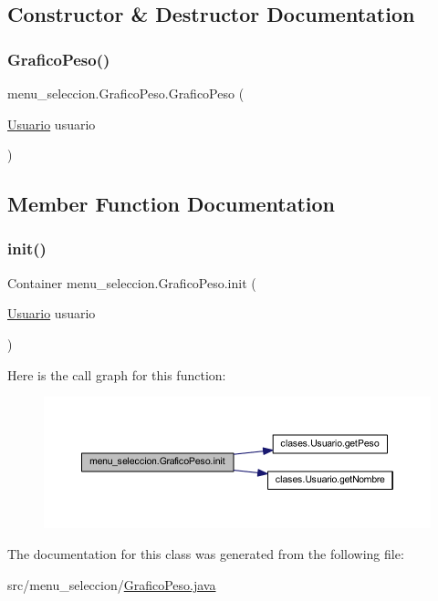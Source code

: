 \subsection{Constructor \& Destructor Documentation}
\mbox{\label{classmenu__seleccion_1_1_grafico_peso_a099eb455c9f0271c11c8467331c71d29}} 
\subsubsection{\texorpdfstring{Grafico\+Peso()}{GraficoPeso()}}
{\footnotesize\ttfamily menu\+\_\+seleccion.\+Grafico\+Peso.\+Grafico\+Peso (\begin{DoxyParamCaption}\item[{\mbox{\hyperlink{classclases_1_1_usuario}{Usuario}}}]{usuario }\end{DoxyParamCaption})}



\subsection{Member Function Documentation}
\mbox{\label{classmenu__seleccion_1_1_grafico_peso_a4f2890aa8adb5aec8648b0efd8aef145}} 
\subsubsection{\texorpdfstring{init()}{init()}}
{\footnotesize\ttfamily Container menu\+\_\+seleccion.\+Grafico\+Peso.\+init (\begin{DoxyParamCaption}\item[{\mbox{\hyperlink{classclases_1_1_usuario}{Usuario}}}]{usuario }\end{DoxyParamCaption})}

Here is the call graph for this function\+:
\nopagebreak
\begin{figure}[H]
\begin{center}
\leavevmode
\includegraphics[width=350pt]{classmenu__seleccion_1_1_grafico_peso_a4f2890aa8adb5aec8648b0efd8aef145_cgraph}
\end{center}
\end{figure}


The documentation for this class was generated from the following file\+:\begin{DoxyCompactItemize}
\item 
src/menu\+\_\+seleccion/\mbox{\hyperlink{_grafico_peso_8java}{Grafico\+Peso.\+java}}\end{DoxyCompactItemize}
